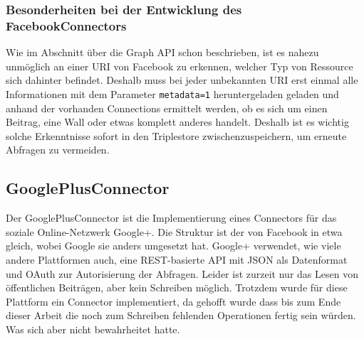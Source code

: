 
\subsubsection{Besonderheiten bei der Entwicklung des FacebookConnectors} %
\label{ssub:besonderheiten_bei_der_entwicklung_des_facebookconnectors}

Wie im Abschnitt über die Graph API schon beschrieben, ist es nahezu unmöglich an einer URI von Facebook zu erkennen, welcher Typ von Ressource sich dahinter befindet. Deshalb muss bei jeder unbekannten URI erst einmal alle Informationen mit dem Parameter \texttt{metadata=1} heruntergeladen geladen  und anhand der vorhanden Connections ermittelt werden, ob es sich um einen Beitrag, eine Wall oder etwas komplett anderes handelt. Deshalb ist es wichtig solche Erkenntnisse sofort in den Triplestore zwischenzuspeichern, um erneute Abfragen zu vermeiden.



\subsection{GooglePlusConnector} %
\label{sub:google_plus_connector}

Der GooglePlusConnector ist die Implementierung eines Connectors für das soziale Online-Netzwerk Google+. Die Struktur ist der von Facebook in etwa gleich, wobei Google sie anders umgesetzt hat. Google+ verwendet, wie viele andere Plattformen auch, eine REST-basierte API mit JSON als Datenformat und OAuth zur Autorisierung der Abfragen. Leider ist zurzeit nur das Lesen von öffentlichen Beiträgen, aber kein Schreiben möglich. Trotzdem wurde für diese Plattform ein Connector implementiert, da gehofft wurde dass bis zum Ende dieser Arbeit die noch zum Schreiben fehlenden Operationen fertig sein würden. Was sich aber nicht bewahrheitet hatte.


